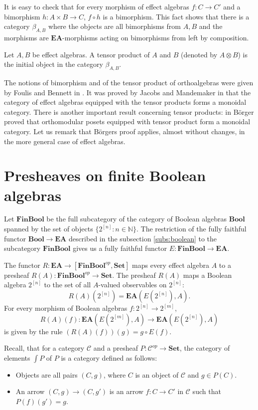\documentclass[smallextended]{svjour3}
\begin{document}
It is easy to check that for every morphism of effect algebras $f:C\to C'$
and a bimorphism $h:A\times B\to C$, $f\circ h$ is a bimorphism. This fact shows that there
is a category $\beta_{A,B}$
where the objects are all bimorphisms from $A,B$ and the morphisms are ${\mathbf{EA}}$-morphisms acting on bimorphisms
from left by composition.

\begin{definition}
\cite{dvurevcenskij1995tensor}
Let $A,B$ be effect algebras. A tensor product of $A$ and $B$ 
(denoted by $A\otimes B$) is the initial object in the category $\beta_{A,B}$.
\end{definition}

The notions of bimorphism and of the tensor product of orthoalgebras were given by
Foulis and Bennett in \cite{foulis1993tensor}. It was proved by Jacobs and Mandemaker
in \cite{jacobs2012coreflections} that the category of effect algebras equipped with
the tensor products forms a monoidal category. There is another important result concerning tensor
products:
in \cite{borger2004tensor} B\"orger proved that orthomodular posets equipped
with tensor product form a monoidal category. Let us remark that B\"orgers proof
applies, almost without changes, in the more general case of effect algebras.

\section{Presheaves on finite Boolean algebras}

Let ${\mathbf{FinBool}}$ be the full subcategory of the category of Boolean algebras
${\mathbf{Bool}}$ spanned by the set of objects $\{2^{[n]}\colon n\in\mathbb N\}$. The
restriction of the fully faithful functor ${\mathbf{Bool}}\to{\mathbf{EA}}$ described in the
subsection \ref{subs:boolean} to the subcategory ${\mathbf{FinBool}}$ gives us a fully faithful
functor $E:{\mathbf{FinBool}}\to{\mathbf{EA}}$.

The functor $R:{\mathbf{EA}}\to[{\mathbf{FinBool}}^{op},{\mathbf{Set}}]$ maps every effect algebra $A$ to a presheaf
$R(A):{\mathbf{FinBool}}^{op}\to{\mathbf{Set}}$. The presheaf $R(A)$ maps a Boolean algebra $2^{[n]}$ to the set of
all $A$-valued observables on $2^{[n]}$:
$$
R(A)(2^{[n]})={\mathbf{EA}}(E(2^{[n]}),A).
$$
For every morphism of Boolean algebras $f:2^{[n]}\to 2^{[m]}$,
$$
R(A)(f):{\mathbf{EA}}(E(2^{[m]}),A)\to{\mathbf{EA}}(E(2^{[n]}),A)
$$ is given by the rule
$(R(A)(f))(g)=g\circ E(f)$.

Recall, that for a category ${\mathcal{C}}$ and a 
presheaf $P:{\mathcal{C}}^{op}\to{\mathbf{Set}}$, the category of elements $\int P$ of $P$ is 
a category defined as follows:
\begin{itemize}
\item Objects are all pairs $(C,g)$, where $C$ is an object of ${\mathcal{C}}$ and $g\in P(C)$.
\item An arrow $(C,g)\to (C,g')$ is an arrow $f:C\to C'$ in ${\mathcal{C}}$ such that $P(f)(g')=g$.
\end{itemize}
\end{document}
